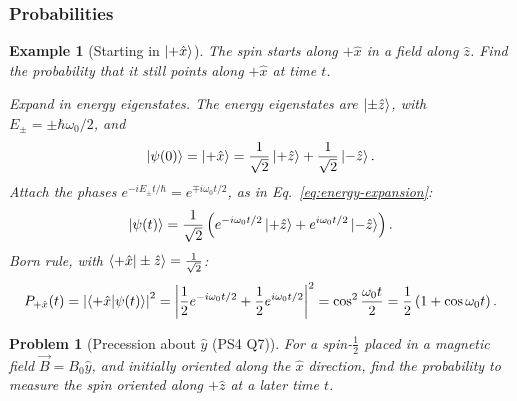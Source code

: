 \documentclass{article}
\newtheorem{problem}{Problem}
\newtheorem*{example}{Example}
\begin{document}
\subsubsection{Probabilities}
\begin{example}[Starting in $\ket{+\hat{x}}$]
    The spin starts along $+\hat{x}$ in a field along $\hat{z}$. Find the probability that it still points along $+\hat{x}$ at time $t$.\par
    \emph{Expand in energy eigenstates.} The energy eigenstates are $\ket{\pm\hat{z}}$, with $E_\pm = \pm\hbar\omega_0/2$, and
    \[\ket{\psi(0)} = \ket{+\hat{x}} = \frac{1}{\sqrt{2}}\ket{+\hat{z}} + \frac{1}{\sqrt{2}}\ket{-\hat{z}}.\]
    \emph{Attach the phases} $e^{-iE_\pm t/\hbar} = e^{\mp i\omega_0t/2}$, as in Eq.~\eqref{eq:energy-expansion}:
    \[\ket{\psi(t)} = \frac{1}{\sqrt{2}}\left(e^{-i\omega_0t/2}\ket{+\hat{z}} + e^{i\omega_0t/2}\ket{-\hat{z}}\right).\]
    \emph{Born rule}, with $\braket{+\hat{x}|\pm\hat{z}} = \tfrac{1}{\sqrt{2}}$:
    \begin{equation}
        P_{+\hat{x}}(t) = \left|\braket{+\hat{x}|\psi(t)}\right|^2 = \left|\frac{1}{2}e^{-i\omega_0t/2} + \frac{1}{2}e^{i\omega_0t/2}\right|^2 = \cos^2\frac{\omega_0t}{2} = \frac{1}{2}\left(1 + \cos\omega_0t\right).
    \end{equation}
\end{example}
\begin{problem}[Precession about $\hat{y}$ (PS4 Q7)]
    \label{prob:prec-y}
    For a spin-$\tfrac12$ placed in a magnetic field $\vec{B} = B_0\hat{y}$, and initially oriented along the $\hat{x}$ direction, find the probability to measure the spin oriented along $+\hat{z}$ at a later time $t$.
\end{problem}
\end{document}
